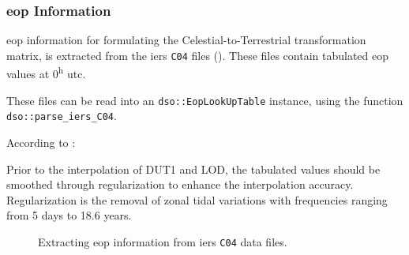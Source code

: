 \subsubsection{\gls{eop} Information}
\Gls{eop} information for formulating the Celestial-to-Terrestrial transformation 
matrix, is extracted from the \gls{iers} \texttt{C04} files (\cite{Bizouard2019}).
These files contain tabulated \gls{eop} values at 0\textsuperscript{h} \gls{utc}. 

These files can be read into an \texttt{dso::EopLookUpTable} instance, using 
the function \texttt{dso::parse\_iers\_C04}.

According to \cite{Bradley2016850}:
\begin{displayquote}
    Prior to the interpolation of DUT1 and LOD, the tabulated values
    should be smoothed through regularization to enhance the
    interpolation accuracy. Regularization is the removal of
    zonal tidal variations with frequencies ranging from 5 days
    to 18.6 years.
\end{displayquote}


\begin{figure}
\centering

\caption{Extracting \gls{eop} information from \gls{iers} \texttt{C04} data files.}
\label{fig:handling-eop}
\end{figure}
